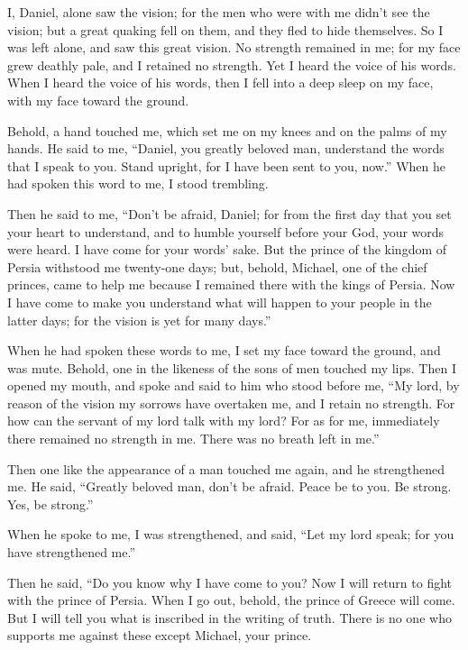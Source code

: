  I, Daniel, alone saw the vision; for the men who were with
me didn't see the vision; but a great quaking fell on them, and they
fled to hide themselves.  So I was left alone, and saw this
great vision. No strength remained in me; for my face grew deathly pale,
and I retained no strength.  Yet I heard the voice of his
words. When I heard the voice of his words, then I fell into a deep
sleep on my face, with my face toward the ground.

 Behold, a hand touched me, which set me on my knees and on
the palms of my hands.  He said to me, ``Daniel, you
greatly beloved man, understand the words that I speak to you. Stand
upright, for I have been sent to you, now.'' When he had spoken this
word to me, I stood trembling.

 Then he said to me, ``Don't be afraid, Daniel; for from
the first day that you set your heart to understand, and to humble
yourself before your God, your words were heard. I have come for your
words' sake.  But the prince of the kingdom of Persia
withstood me twenty-one days; but, behold, Michael, one of the chief
princes, came to help me because I remained there with the kings of
Persia.  Now I have come to make you understand what will
happen to your people in the latter days; for the vision is yet for many
days.''

 When he had spoken these words to me, I set my face toward
the ground, and was mute.  Behold, one in the likeness of
the sons of men touched my lips. Then I opened my mouth, and spoke and
said to him who stood before me, ``My lord, by reason of the vision my
sorrows have overtaken me, and I retain no strength.  For
how can the servant of my lord talk with my lord? For as for me,
immediately there remained no strength in me. There was no breath left
in me.''

 Then one like the appearance of a man touched me again,
and he strengthened me.  He said, ``Greatly beloved man,
don't be afraid. Peace be to you. Be strong. Yes, be strong.''

When he spoke to me, I was strengthened, and said, ``Let my lord speak;
for you have strengthened me.''

 Then he said, ``Do you know why I have come to you? Now I
will return to fight with the prince of Persia. When I go out, behold,
the prince of Greece will come.  But I will tell you what
is inscribed in the writing of truth. There is no one who supports me
against these except Michael, your prince.

